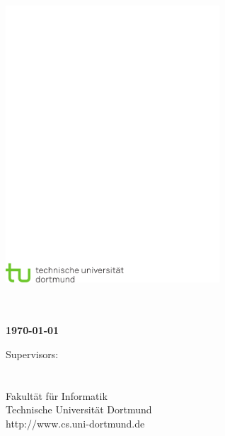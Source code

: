 \thispagestyle{empty}
\begin{titlepage}
\vspace*{-2cm}
\newlength{\links}
\setlength{\links}{-0.5cm} \sf \LARGE



\hspace*{\links}
\begin{minipage}{12.5cm}
\includegraphics[width=8cm]{coverpage/tud_logo_cmyk}
\end{minipage}

\vspace*{4cm}

\hspace*{\links}
\hspace*{-0.2cm}
\begin{minipage}{9cm}
\large
\begin{center}
\bf{\Titel} \\
\vspace*{1cm}
\vspace*{1.5cm}
\Autor\\
\today
\end{center}
\end{minipage}



\vfill

\hspace*{\links}
\begin{minipage}[b]{15cm}
\normalsize
\raggedright
%
\vspace*{2.5cm}
%
\normalsize \raggedright
Supervisors: \\
\Supervisor \\
\otherSupervisor \\ 
\vspace*{1.5cm}
\textcolor{TUGreen}{Fakultät für Informatik\\
Technische Universität Dortmund \\
http://www.cs.uni-dortmund.de}
\end{minipage}


\end{titlepage}
